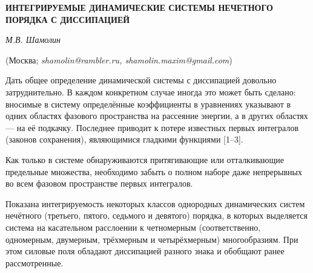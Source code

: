 
\begin{center}
    {\bf ИНТЕГРИРУЕМЫЕ ДИНАМИЧЕСКИЕ СИСТЕМЫ НЕЧЕТНОГО ПОРЯДКА
С ДИССИПАЦИЕЙ}

    {\it М.В. Шамолин}

    (Москва; {\it shamolin@rambler.ru, shamolin.maxim@gmail.com})
\end{center}






Дать общее определение динамической системы с диссипацией довольно
затруднительно. В каждом конкретном случае иногда это может быть
сделано: вносимые в систему определённые коэффициенты в уравнениях
указывают в одних областях фазового пространства на рассеяние
энергии, а в других областях --- на её подкачку. Последнее приводит
к потере известных первых интегралов (законов сохранения),
являющимися гладкими функциями [1--3].

Как только в системе обнаруживаются притягивающие или отталкивающие
предельные множества, необходимо забыть о полном наборе даже
непрерывных во всем фазовом пространстве первых интегралов.

Показана интегрируемость некоторых классов однородных динамических
систем нечётного (третьего, пятого, седьмого и девятого) порядка, в
которых выделяется система на касательном расслоении к четномерным
(соответственно, одномерным, двумерным, трёхмерным и четырёхмерным)
многообразиям. При этом силовые поля обладают диссипацией разного
знака и обобщают ранее рассмотренные.

